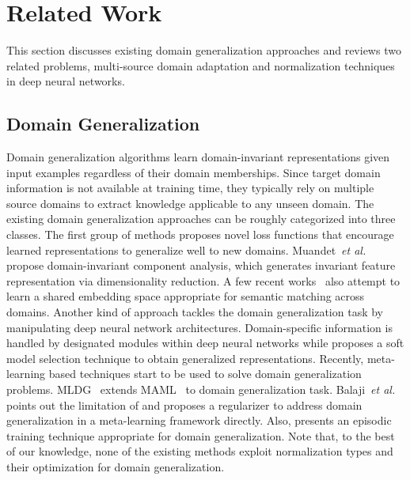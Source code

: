\documentclass[runningheads]{llncs}
\newcommand\etal{\textit{et al.}}
\begin{document}
 

\section{Related Work}
\label{sec:related}

This section discusses existing domain generalization approaches and reviews two related problems, multi-source domain adaptation and normalization techniques in deep neural networks.

\subsection{Domain Generalization}
Domain generalization algorithms learn domain-invariant representations given input examples regardless of their domain memberships.
Since target domain information is not available at training time, they typically rely on multiple source domains to extract knowledge applicable to any unseen domain.
The existing domain generalization approaches can be roughly categorized into three classes.
The first group of methods proposes novel loss functions that encourage learned representations to generalize well to new domains.
Muandet~\etal~\cite{muandet2013domain} propose domain-invariant component analysis, which generates invariant feature representation via dimensionality reduction.
A few recent works~\cite{motiian2017unified,li2018domain,dou2019domain} also attempt to learn a shared embedding space appropriate for semantic matching across domains.
Another kind of approach tackles the domain generalization task by manipulating deep neural network architectures.
Domain-specific information is handled by designated modules within deep neural networks \cite{pacs,dinnocente2018domain,matsuura2020domain} while \cite{mancini2018best} proposes a soft model selection technique to obtain generalized representations.
Recently, meta-learning based techniques start to be used to solve domain generalization problems.
MLDG~\cite{li2018learning} extends MAML~\cite{finn2017model} to domain generalization task.
Balaji~\etal~\cite{balaji2018metareg} points out the limitation of \cite{li2018learning} and proposes a regularizer to address domain generalization in a meta-learning framework directly.
Also, \cite{li2019episodic} presents an episodic training technique appropriate for domain generalization.
Note that, to the best of our knowledge, none of the existing methods exploit normalization types and their optimization for domain generalization.
\end{document}
